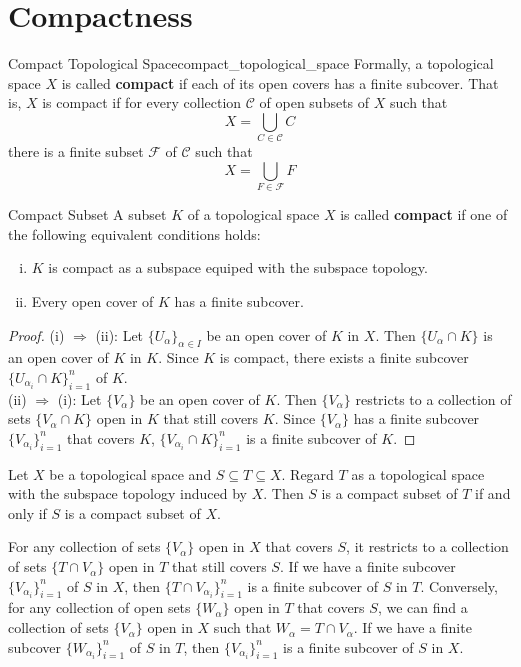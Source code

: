 \documentclass{report}
\begin{document}
\section{Compactness}
\begin{definition}{Compact Topological Space}{compact_topological_space}
	Formally, a topological space $X$ is called \textbf{compact} if each of its open covers has a finite subcover. That is, $X$ is compact if for every collection $\mathcal{C}$ of open subsets of $X$ such that
	\[
		X=\bigcup_{C \in \mathcal{C}} C
	\]
	there is a finite subset $\mathcal{F}$ of $\mathcal{C}$ such that
	\[
		X=\bigcup_{F \in \mathcal{F}} F
	\]
\end{definition}

\begin{definition}{Compact Subset}{}
	A subset $K$ of a topological space $X$ is called \textbf{compact} if one of the following equivalent conditions holds:

	\begin{enumerate}[(i)]
		\item $K$ is compact as a subspace equiped with the subspace topology.
		\item Every open cover of $K$ has a finite subcover.
	\end{enumerate}
\end{definition}

\begin{proof}
	(i) $\Rightarrow$ (ii): Let $\{U_\alpha\}_{\alpha\in I
	}$ be an open cover of $K$ in $X$. Then $\{U_\alpha\cap K\}$ is an open cover of $K$ in $K$. Since $K$ is compact, there exists a finite subcover $\{U_{\alpha_i}\cap K\}_{i=1}^n$ of $K$.\\
	(ii) $\Rightarrow$ (i): Let $\{V_\alpha\}$ be an open cover of $K$. Then $\{V_\alpha\}$ restricts to a collection of sets $\{V_\alpha\cap K\}$ open in $K$ that still covers $K$. Since $\{V_\alpha\}$ has a finite subcover $\{V_{\alpha_i}\}_{i=1}^n$ that covers $K$, $\{V_{\alpha_i}\cap K\}_{i=1}^n$ is a finite subcover of $K$.
\end{proof}

\begin{lemma}{}{}
	Let $X$ be a topological space and $S \subseteq T \subseteq X$. Regard $T$ as a topological space with the subspace topology induced by $X$. Then $S$ is a compact subset of $T$ if and only if $S$ is a compact subset of $X$.
\end{lemma}

\begin{prf}
	For any collection of sets $\{V_\alpha\}$ open in $X$ that covers $S$, it restricts to a collection of sets $\{T\cap V_\alpha\}$ open in $T$ that still covers $S$. If we have a finite subcover $\{V_{\alpha_i}\}_{i=1}^n$ of $S$ in $X$, then $\{T\cap V_{\alpha_i}\}_{i=1}^n$ is a finite subcover of $S$ in $T$. Conversely, for any collection of open sets $\{W_\alpha\}$ open in $T$ that covers $S$, we can find a collection of sets $\{V_\alpha\}$ open in $X$ such that $W_\alpha=T\cap V_\alpha$. If we have a finite subcover $\{W_{\alpha_i}\}_{i=1}^n$ of $S$ in $T$, then $\{V_{\alpha_i}\}_{i=1}^n$ is a finite subcover of $S$ in $X$.
\end{prf}
\end{document}
